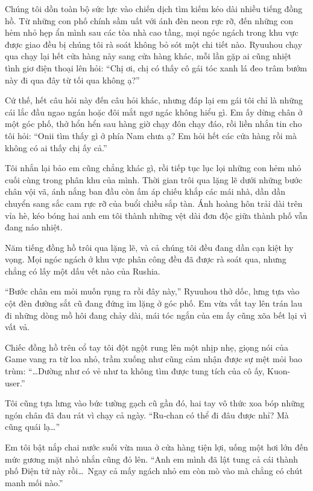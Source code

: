 \documentclass[../main.tex]{subfiles}
\begin{document}
Chúng tôi dồn toàn bộ sức lực vào chiến dịch tìm kiếm kéo dài nhiều tiếng đồng hồ. Từ những con phố chính sầm uất với ánh đèn neon rực rỡ, đến những con hẻm nhỏ hẹp ẩn mình sau các tòa nhà cao tầng, mọi ngóc ngách trong khu vực được giao đều bị chúng tôi rà soát không bỏ sót một chi tiết nào. Ryuuhou chạy qua chạy lại hết cửa hàng này sang cửa hàng khác, mỗi lần gặp ai cũng nhiệt tình giơ điện thoại lên hỏi: ``Chị ơi, chị có thấy cô gái tóc xanh lá đeo trâm bướm này đi qua đây từ tối qua không ạ?''

Cứ thế, hết câu hỏi này đến câu hỏi khác, nhưng đáp lại em gái tôi chỉ là những cái lắc đầu ngao ngán hoặc đôi mắt ngơ ngác không hiểu gì. Em ấy dừng chân ở một góc phố, thở hổn hển sau hàng giờ chạy đôn chạy đáo, rồi liền nhắn tin cho tôi hỏi: ``Onii tìm thấy gì ở phía Nam chưa ạ? Em hỏi hết các cửa hàng rồi mà không có ai thấy chị ấy cả.''

Tôi nhắn lại bảo em cũng chẳng khác gì, rồi tiếp tục lục lọi những con hẻm nhỏ cuối cùng trong phân khu của mình. Thời gian trôi qua lặng lẽ dưới những bước chân vội vã, ánh nắng ban đầu còn ấm áp chiếu khắp các mái nhà, dần dần chuyển sang sắc cam rực rỡ của buổi chiều sắp tàn. Ánh hoàng hôn trải dài trên vỉa hè, kéo bóng hai anh em tôi thành những vệt dài đơn độc giữa thành phố vẫn đang náo nhiệt.

\ct

Năm tiếng đồng hồ trôi qua lặng lẽ, và cả chúng tôi đều đang dần cạn kiệt hy vọng. Mọi ngóc ngách ở khu vực phân công đều đã được rà soát qua, nhưng chẳng có lấy một dấu vết nào của Rushia.

``Bước chân em mỏi muốn rụng ra rồi đây này,'' Ryuuhou thở dốc, lưng tựa vào cột đèn đường sắt cũ đang đứng im lặng ở góc phố. Em vừa vắt tay lên trán lau đi những dòng mồ hôi đang chảy dài, mái tóc ngắn của em ấy cũng xõa bết lại vì vất vả.

Chiếc đồng hồ trên cổ tay tôi đột ngột rung lên một nhịp nhẹ, giọng nói của Game vang ra từ loa nhỏ, trầm xuống như cũng cảm nhận được sự mệt mỏi bao trùm: ``\dots Dường như có vẻ như ta không tìm được tung tích của cô ấy, Kuon-user.''

Tôi cũng tựa lưng vào bức tường gạch cũ gần đó, hai tay vô thức xoa bóp những ngón chân đã đau rát vì chạy cả ngày. ``Ru-chan có thể đi đâu được nhỉ? Mà cũng quái lạ\dots''

Em tôi bật nắp chai nước suối vừa mua ở cửa hàng tiện lợi, uống một hơi lớn đến mức gương mặt nhỏ nhắn cũng đỏ lên. ``Anh em mình đã lật tung cả cái thành phố Điện tử này rồi\dots\ Ngay cả mấy ngách nhỏ em còn mò vào mà chẳng có chút manh mối nào.''
\end{document}
